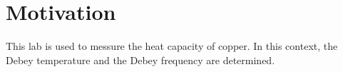 \section{Motivation}
\label{sec:Zielsetzung}
This lab is used to messure the heat capacity of copper. In this context, the Debey temperature and the Debey frequency are determined.
